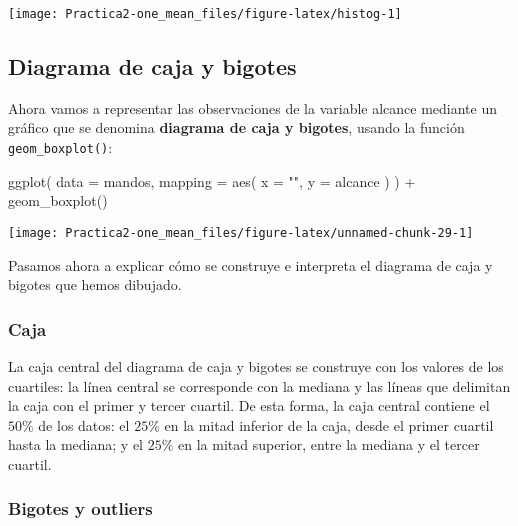 \documentclass[
  degree=mecinf,
  title=normal,
  toc=normal,
  bib=normal]{mnye}
\newenvironment{Shaded}{\begin{snugshade}}{\end{snugshade}}
\newcommand{\AttributeTok}[1]{\textcolor[rgb]{0.77,0.63,0.00}{#1}}
\newcommand{\FunctionTok}[1]{\textcolor[rgb]{0.00,0.00,0.00}{#1}}
\newcommand{\NormalTok}[1]{#1}
\newcommand{\SpecialCharTok}[1]{\textcolor[rgb]{0.00,0.00,0.00}{#1}}
\newcommand{\StringTok}[1]{\textcolor[rgb]{0.31,0.60,0.02}{#1}}
\begin{document}
\begin{center}\texttt{[image: Practica2-one\_mean\_files/figure-latex/histog-1]} \end{center}

\hypertarget{boxplot}{%
\subsection{Diagrama de caja y bigotes}\label{boxplot}}

Ahora vamos a representar las observaciones de la variable alcance mediante un gráfico que se denomina \textbf{diagrama de caja y bigotes}, usando la función \texttt{geom\_boxplot()}:

\begin{Shaded}
\begin{Highlighting}[]
\FunctionTok{ggplot}\NormalTok{(}
    \AttributeTok{data =}\NormalTok{ mandos,}
    \AttributeTok{mapping =} \FunctionTok{aes}\NormalTok{(}
        \AttributeTok{x =} \StringTok{""}\NormalTok{,}
        \AttributeTok{y =}\NormalTok{ alcance}
\NormalTok{    )}
\NormalTok{) }\SpecialCharTok{+}
\FunctionTok{geom\_boxplot}\NormalTok{()}
\end{Highlighting}
\end{Shaded}

\begin{center}\texttt{[image: Practica2-one\_mean\_files/figure-latex/unnamed-chunk-29-1]} \end{center}

Pasamos ahora a explicar cómo se construye e interpreta el diagrama de caja y bigotes que hemos dibujado.

\hypertarget{caja}{%
\subsubsection{Caja}\label{caja}}

La caja central del diagrama de caja y bigotes se construye con los valores de los cuartiles: la línea central se corresponde con la mediana y las líneas que delimitan la caja con el primer y tercer cuartil. De esta forma, la caja central contiene el \(50\%\) de los datos: el \(25\%\) en la mitad inferior de la caja, desde el primer cuartil hasta la mediana; y el \(25\%\) en la mitad superior, entre la mediana y el tercer cuartil.

\hypertarget{bigotes-y-outliers}{%
\subsubsection{Bigotes y outliers}\label{bigotes-y-outliers}}
\end{document}
